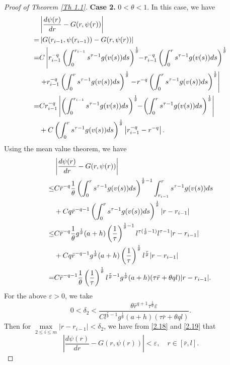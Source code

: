 \documentclass[a4paper,11pt]{amsart}
\theoremstyle{plain}
\theoremstyle{remark}
\numberwithin{equation}{section}
\numberwithin{figure}{section}
\numberwithin{remark}{section}
\begin{document}
\begin{sloppypar}
\begin{proof}[Proof of Theorem \ref{Th 1.1}]
	{\bf Case 2.} $0<\theta <1$. In this case, we have
	 \begin{align}
	  &\left| \frac{d\psi(r)}{dr}-G(r,\psi(r))\right| \notag\\
	=&\left| G(r_{i-1},\psi (r_{i-1}))-G(r,\psi(r))\right| \notag\\
	=&C \left| 	r_{i-1}^{-q}\left( \int_{0}^{r_{i-1}}s^{\tau-1}g(v(s))ds\right)^\frac{1}{\theta}\!\!-\!	r_{i-1}^{-q}\left( \int_{0}^{r}s^{\tau-1}g(v(s))ds\right)^\frac{1}{\theta}\right. \notag\\
	  & \left. + 	r_{i-1}^{-q}\left( \int_{0}^{r}s^{\tau-1}g(v(s))ds\right)^\frac{1}{\theta} - \!	r^{-q}\left( \int_{0}^{r}s^{\tau-1}g(v(s))ds\right)^\frac{1}{\theta} \right | \notag \\
	=&Cr_{i-1}^{-q}  \left| \left( \int_{0}^{r_{i-1}}s^{\tau-1}g(v(s))ds\right)^\frac{1}{\theta}\!\!-\!	\left( \int_{0}^{r}s^{\tau-1}g(v(s))ds\right)^\frac{1}{\theta}\right| \notag \\
	  & + C \left( \int_{0}^{r}s^{\tau-1}g(v(s))ds\right)^\frac{1}{\theta} \left | r_{i-1}^{-q} - r^{-q} \right |. \notag
	 \end{align}	
	 Using the mean value theorem, we have
	 \begin{align}
	     &\left| \frac{d\psi(r)}{dr}-G(r,\psi(r))\right| \notag\\
	\le & C {\bar r}^{-q} \frac{1}{\theta} \left( \int_{0}^{r}s^{\tau-1}g(v(s))ds\right)^{\frac{1}{\theta}-1} \int_{r_{i-1}}^{r}s^{\tau-1}g(v(s))ds \notag \\
	     & + Cq {\bar r}^{-q-1} \left( \int_{0}^{r}s^{\tau-1}g(v(s))ds\right)^\frac{1}{\theta} |r-r_{i-1}| \notag \\
	\le & C {\bar r}^{-q} \frac{1}{\theta} g^{\frac{1}{\theta}}(a+h) \left ( \frac{1}{\tau} \right )^{\frac{1}{\theta}-1} l^{\tau(\frac{1}{\theta}-1)}l^{\tau-1} |r-r_{i-1}| \label{2.18} \\
	     & + Cq {\bar r}^{-q-1} g^{\frac{1}{\theta}}(a+h)\left ( \frac{1}{\tau} \right )^{\frac{1}{\theta}} l^{\frac{\tau}{\theta}} |r-r_{i-1}| \notag \\
	   =&  C {\bar r}^{-q-1} \frac{1}{\theta} \left ( \frac{1}{\tau} \right )^{\frac{1}{\theta}} l^{\frac{\tau}{\theta}-1}  g^{\frac{1}{\theta}}(a+h) ( \tau \bar r + \theta q l ) |r-r_{i-1}|. \notag
	 \end{align}
	 For the above $\varepsilon>0$, we take
	 \begin{equation}\label{2.19}
	 0<\delta_2 < \frac{\theta {\bar r}^{q+1} \tau^{\frac{1}{\theta}} \varepsilon}{C l^{\frac{\tau}{\theta}-1}  g^{\frac{1}{\theta}}(a+h) ( \tau \bar r + \theta q l )}.
	 \end{equation}
	 Then for $\max\limits_{2\leq i \leq m}\left|r-r_{i-1} \right| <\delta_2$, we have from \eqref{2.18} and \eqref{2.19} that
	 \begin{equation}\label{2.14''}
	 \left| \frac{d\psi(r)}{dr}-G(r,\psi(r))\right|<\varepsilon, \quad r\in [\bar r,l].
	 \end{equation}	
	 

\end{proof}
\end{sloppypar}
\end{document}
